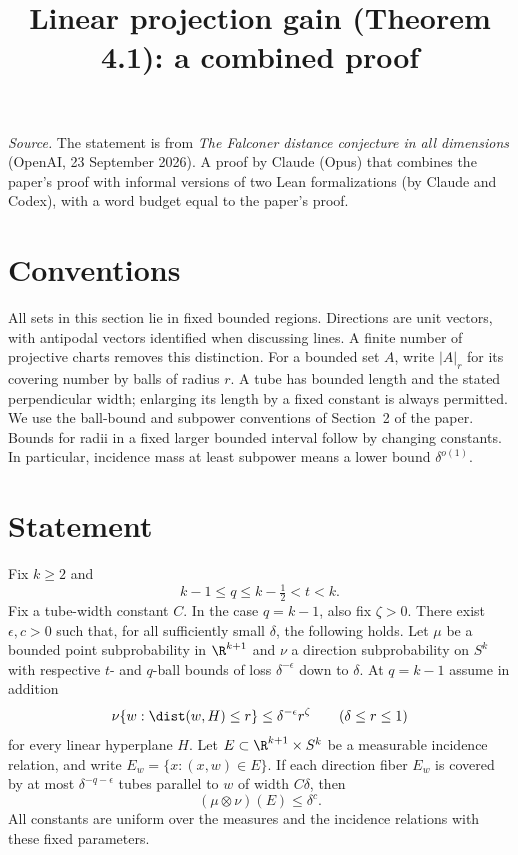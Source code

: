 \documentclass[11pt,reqno]{amsart}
\title{Linear projection gain (Theorem 4.1): a combined proof}
\begin{document}
\maketitle
\noindent\emph{Source.} The statement is from \emph{The Falconer distance conjecture in all dimensions} (OpenAI, 23 September 2026). A proof by Claude (Opus) that combines the paper's proof with informal versions of two Lean formalizations (by Claude and Codex), with a word budget equal to the paper's proof.

\section*{Conventions}
All sets in this section lie in fixed bounded regions. Directions are unit
vectors, with antipodal vectors identified when discussing lines. A finite
number of projective charts removes this distinction. For a bounded set
$A$, write $|A|_r$ for its covering number by balls of radius $r$. A tube has
bounded length and the stated perpendicular width; enlarging its length by
a fixed constant is always permitted. We use the ball-bound and subpower
conventions of Section~2 of the paper. Bounds for radii in a fixed
larger bounded interval follow by changing constants. In particular,
incidence mass at least subpower means a lower bound $\delta^{o(1)}$.

\section*{Statement}
\begin{theorem}\label{ang:linear-gain}
Fix $k\ge2$ and
\[
 k-1\le q\le k-\tfrac12<t<k.
\]
Fix a tube-width constant $C$. In the case $q=k-1$, also fix
$\zeta>0$. There exist $\epsilon,c>0$ such that, for all sufficiently
small $\delta$, the following holds. Let $\mu$ be a bounded point
subprobability in $\R^{k+1}$ and $\nu$ a direction subprobability on $S^k$
with respective $t$- and $q$-ball bounds of loss $\delta^{-\epsilon}$
down to $\delta$. At $q=k-1$ assume in addition
\begin{equation}\label{ang:endpoint-plate}
 \nu\{w:\dist(w,H)\le r\}\le\delta^{-\epsilon}r^\zeta
       \qquad(\delta\le r\le1)
\end{equation}
for every linear hyperplane $H$. Let $E\subset\R^{k+1}\times S^k$ be a
measurable incidence relation, and write $E_w=\{x:(x,w)\in E\}$.
If each direction fiber $E_w$ is covered by at most
$\delta^{-q-\epsilon}$ tubes parallel to $w$ of width $C\delta$, then
\[
 (\mu\otimes\nu)(E)\le\delta^c.
\]
All constants are uniform over the measures and the incidence relations
with these fixed parameters.
\end{theorem}
\end{document}
